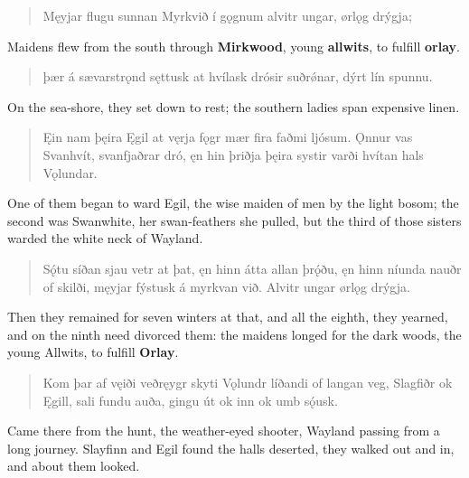 \begin{verse}
\bva Męyjar flugu sunnan \hld Myrkvið í gǫgnum
alvitr ungar, \hld ørlǫg drýgja; \\%
\end{verse}

\bvb Maidens flew from the south through \textbf{Mirkwood}, young \textbf{allwits}, to fulfill \textbf{orlay}. \\

\begin{verse}
\bva þær á sævarstrǫnd \hld sęttusk at hvílask
drósir suðrǿnar, \hld dýrt lín spunnu. \\%
\end{verse}

\bvb On the sea-shore, they set down to rest; the southern ladies span expensive linen. \\

\begin{verse}
\bva Ęin nam þęira \hld Ęgil at vęrja
fǫgr mær fira \hld faðmi ljósum.
Ǫnnur vas Svanhvít, \hld svanfjaðrar dró,
ęn hin þriðja \hld þęira systir
varði hvítan \hld hals Vǫlundar. \\%
\end{verse}

\bvb One of them began to ward Egil, the wise maiden of men by the light bosom; the second was Swanwhite, her swan-feathers she pulled, but the third of those sisters warded the white neck of Wayland. \\

\begin{verse}
\bva Sǫ́tu síðan \hld sjau vetr at þat,
ęn hinn átta \hld allan þrǫ́ðu,
ęn hinn níunda \hld nauðr of skilði,
męyjar fýstusk \hld á myrkvan við.
Alvitr ungar \hld ørlǫg drýgja. \\%
\end{verse}

\bvb Then they remained for seven winters at that, and all the eighth, they yearned, and on the ninth need divorced them: the maidens longed for the dark woods, the young Allwits, to fulfill \textbf{Orlay}. \\

\begin{verse}
\bva Kom þar af vęiði \hld veðręygr skyti
Vǫlundr líðandi \hld of langan veg,
Slagfiðr ok Ęgill, \hld sali fundu auða,
gingu út ok inn \hld ok umb sǫ́usk. \\%
\end{verse}

\bvb Came there from the hunt, the weather-eyed shooter, Wayland passing from a long journey. Slayfinn and Egil found the halls deserted, they walked out and in, and about them looked. \\

